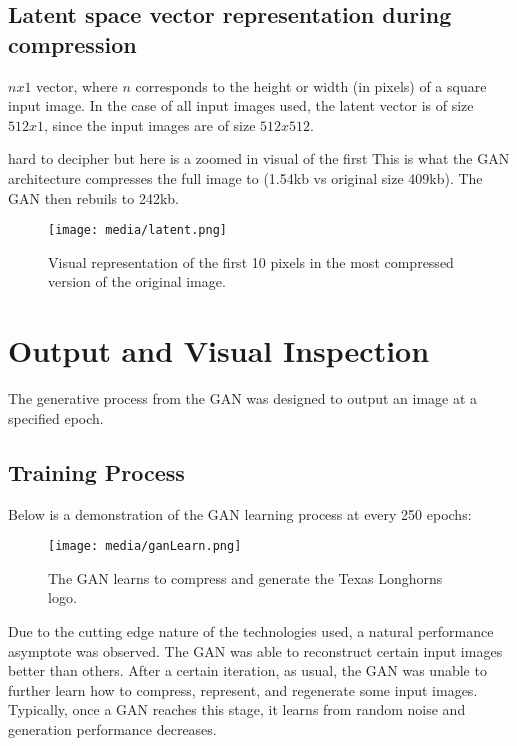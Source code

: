 \subsection{Latent space vector representation during compression}

$nx1$ vector, where $n$ corresponds to the height or width (in pixels)
of a square input image. In the case of all input images used, the latent vector
is of size $512x1$, since the input images are of size $512x512$.

hard to decipher but here is a zoomed in visual of the first
This is what the GAN architecture compresses the full image to (1.54kb vs original size 409kb).
The GAN then rebuils to 242kb.


\begin{figure}[H]
	\begin{center}
	\texttt{[image: media/latent.png]}
	\end{center}
	\caption[Latent Space Representation]{Visual representation of the first 10 pixels in the most compressed version of the original image.}
	\end{figure}

\section{Output and Visual Inspection}
The generative process from the GAN was designed to output an image at a specified epoch.

\subsection{Training Process}
Below is a demonstration of the GAN learning process at every 250 epochs:
\begin{figure}[H]
	\begin{center}
	\texttt{[image: media/ganLearn.png]}
	\end{center}
	\caption[GAN Training Process]{The GAN learns to compress and generate the Texas Longhorns logo.}
	\end{figure}

Due to the cutting edge nature of the technologies used, a natural performance asymptote
was observed. The GAN was able to reconstruct certain input images better than others.
After a certain iteration, as usual, the GAN was unable to further learn how to compress,
represent, and regenerate some input images. Typically, once a GAN reaches this stage,
it learns from random noise and generation performance decreases.

